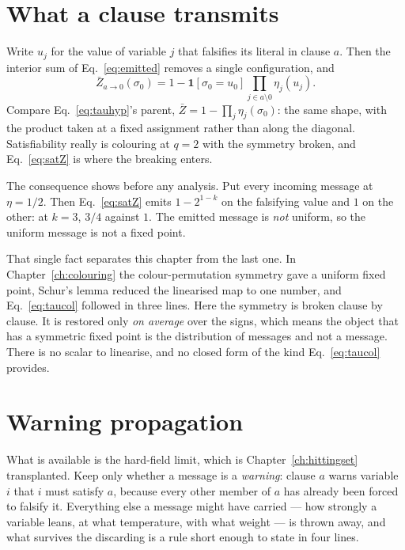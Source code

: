 \section{What a clause transmits}
\label{sec:whatclausetransmits}

Write $u_{j}$ for the value of variable $j$ that falsifies its literal in clause
$a$. Then the interior sum of Eq.~\eqref{eq:emitted} removes a single
configuration, and
\begin{equation}
  \bar{Z}_{a\to0}(\sigma_{0})
    =1-\mathbf{1}[\sigma_{0}=u_{0}]\prod_{j\in a\setminus0}\eta_{j}(u_{j}).
  \label{eq:satZ}
\end{equation}
Compare Eq.~\eqref{eq:tauhyp}'s parent, $\bar{Z}=1-\prod_{j}\eta_{j}(\sigma_{0})$: the
same shape, with the product taken at a fixed assignment rather than along the
diagonal. Satisfiability really is colouring at $q=2$ with the symmetry broken,
and Eq.~\eqref{eq:satZ} is where the breaking enters.

The consequence shows before any analysis. Put every incoming message
at $\eta=1/2$. Then Eq.~\eqref{eq:satZ} emits $1-2^{1-k}$ on the falsifying
value and $1$ on the other: at $k=3$, $3/4$ against $1$. The emitted message is
\emph{not} uniform, so the uniform message is not a fixed point.

That single fact separates this chapter from the last one. In
Chapter~\ref{ch:colouring} the colour-permutation symmetry gave a uniform fixed
point, Schur's lemma reduced the linearised map to one number, and
Eq.~\eqref{eq:taucol} followed in three lines. Here the symmetry is broken
clause by clause. It is restored only \emph{on average} over the signs, which
means the object that has a symmetric fixed point is the distribution of
messages and not a message. There is no scalar to linearise, and no closed form
of the kind Eq.~\eqref{eq:taucol} provides.

\section{Warning propagation}
\label{sec:sat-wp}

What is available is the hard-field limit, which is Chapter~\ref{ch:hittingset}
transplanted. Keep only whether a message is a \emph{warning}: clause $a$ warns
variable $i$ that $i$ must satisfy $a$, because every other member of $a$ has
already been forced to falsify it. Everything else a message might have carried
--- how strongly a variable leans, at what temperature, with what weight --- is
thrown away, and what survives the discarding is a rule short enough to state in
four lines.


